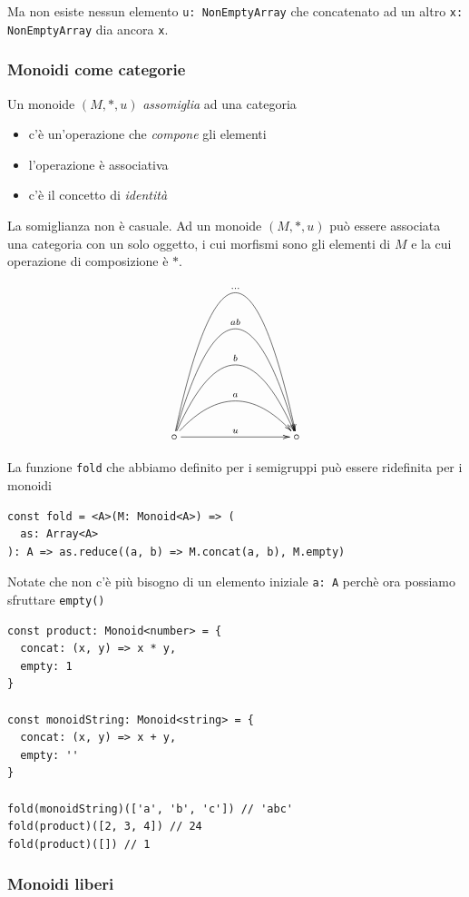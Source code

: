 \documentclass[12pt]{article}
\begin{document}
Ma non esiste nessun elemento \texttt{u: NonEmptyArray} che concatenato ad un altro \texttt{x: NonEmptyArray} dia ancora \texttt{x}.

\subsubsection{Monoidi come categorie}

Un monoide $(M, *, u)$ \emph{assomiglia} ad una categoria

\begin{itemize}
  \item c'è un'operazione che \emph{compone} gli elementi
  \item l'operazione è associativa
  \item c'è il concetto di \emph{identità}
\end{itemize}

La somiglianza non è casuale. Ad un monoide $(M, *, u)$ può essere associata una categoria con un solo oggetto,
i cui morfismi sono gli elementi di $M$ e la cui operazione di composizione è $*$.

\[
\xymatrixrowsep{3cm}
\xymatrixcolsep{3cm}
\xymatrix{
  \circ \ar[r]^u \ar@/^1cm/[r]^a \ar@/^2cm/[r]^b \ar@/^3cm/[r]^{ab} \ar@/^4cm/[r]^{\ldots} & \circ
}
\]

La funzione \texttt{fold} che abbiamo definito per i semigruppi può essere ridefinita per i monoidi

\begin{verbatim}
const fold = <A>(M: Monoid<A>) => (
  as: Array<A>
): A => as.reduce((a, b) => M.concat(a, b), M.empty)
\end{verbatim}

Notate che non c'è più bisogno di un elemento iniziale \texttt{a: A} perchè ora possiamo sfruttare \texttt{empty()}

\begin{verbatim}
const product: Monoid<number> = {
  concat: (x, y) => x * y,
  empty: 1
}

const monoidString: Monoid<string> = {
  concat: (x, y) => x + y,
  empty: ''
}

fold(monoidString)(['a', 'b', 'c']) // 'abc'
fold(product)([2, 3, 4]) // 24
fold(product)([]) // 1
\end{verbatim}

\subsubsection{Monoidi liberi}
\end{document}
